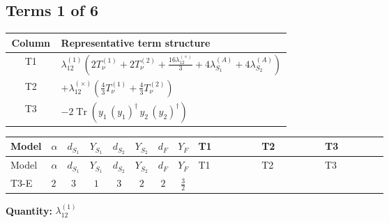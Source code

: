 \documentclass[8pt]{article}
\begin{document}
\begin{landscape}
\subsection*{Terms 1 of 6}
\begin{center}
\begin{tabular}{@{}c >{\raggedright\arraybackslash}p{0.82\linewidth}@{}}
\toprule
Column & Representative term structure \\
\midrule
T1 & \(\displaystyle {\lambda_{12}^{(1)}} \left(2 T_{\nu}^{(1)}+2 T_{\nu}^{(2)}+\frac{16 {\lambda_{12}^{(\times)}}}{3}+4 {\lambda_{S_1}^{(A)}}+4 {\lambda_{S_2}^{(A)}}\right)\) \\
\midrule
T2 & \(\displaystyle +{\lambda_{12}^{(\times)}} \left(\frac{4}{3} T_{\nu}^{(1)}+\frac{4}{3} T_{\nu}^{(2)}\right)\) \\
\midrule
T3 & \(\displaystyle -2 \operatorname{Tr}\!\left({y_1}\,\left({y_1}\right)^{\dagger}\,{y_2}\,\left({y_2}\right)^{\dagger}\right)\) \\
\midrule
\bottomrule
\end{tabular}
\end{center}
\smallskip
\tiny
\begin{longtable}{@{}llcccccc >{\raggedright\arraybackslash}p{0.21\linewidth} >{\raggedright\arraybackslash}p{0.21\linewidth} >{\raggedright\arraybackslash}p{0.21\linewidth}@{}}
\toprule
Model & $\alpha$ & $d_{S_1}$ & $Y_{S_1}$ & $d_{S_2}$ & $Y_{S_2}$ & $d_F$ & $Y_F$ & T1 & T2 & T3 \\
\midrule
\endfirsthead
\toprule
Model & $\alpha$ & $d_{S_1}$ & $Y_{S_1}$ & $d_{S_2}$ & $Y_{S_2}$ & $d_F$ & $Y_F$ & T1 & T2 & T3 \\
\midrule
\endhead
T3-E & $2$ & $3$ & $1$ & $3$ & $2$ & $2$ & $\frac{3}{2}$ & \scriptsize\adjustbox{max width=\linewidth}{$\begin{gathered} {\lambda_{12}^{(1)}} \left(2 T_{\nu}^{(1)}+2 T_{\nu}^{(2)}+\frac{16 {\lambda_{12}^{(\times)}}}{3}+4 {\lambda_{S_1}^{(A)}}+4 {\lambda_{S_2}^{(A)}}\right)\end{gathered}$} & \scriptsize\adjustbox{max width=\linewidth}{$\begin{gathered} +{\lambda_{12}^{(\times)}} \left(\frac{4}{3} T_{\nu}^{(1)}+\frac{4}{3} T_{\nu}^{(2)}\right)\end{gathered}$} & \scriptsize\adjustbox{max width=\linewidth}{$\begin{gathered} -2 \operatorname{Tr}\!\left({y_1}\,\left({y_1}\right)^{\dagger}\,{y_2}\,\left({y_2}\right)^{\dagger}\right)\end{gathered}$} \\
\midrule
\bottomrule
\end{longtable}
\clearpage
\noindent\textbf{Quantity: }$\lambda_{12}^{(1)}$\par\smallskip

\end{landscape}
\end{document}
